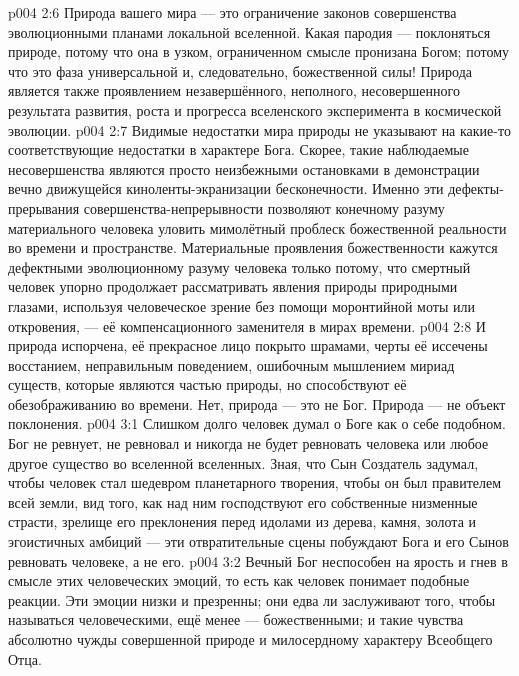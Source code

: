 \vs p004 2:6 Природа вашего мира --- это ограничение законов совершенства эволюционными планами локальной вселенной. Какая пародия --- поклоняться природе, потому что она в узком, ограниченном смысле пронизана Богом; потому что это фаза универсальной и, следовательно, божественной силы! Природа является также проявлением незавершённого, неполного, несовершенного результата развития, роста и прогресса вселенского эксперимента в космической эволюции.
\vs p004 2:7 Видимые недостатки мира природы не указывают на какие\hyp{}то соответствующие недостатки в характере Бога. Скорее, такие наблюдаемые несовершенства являются просто неизбежными остановками в демонстрации вечно движущейся киноленты\hyp{}экранизации бесконечности. Именно эти дефекты\hyp{}прерывания совершенства\hyp{}непрерывности позволяют конечному разуму материального человека уловить мимолётный проблеск божественной реальности во времени и пространстве. Материальные проявления божественности кажутся дефектными эволюционному разуму человека только потому, что смертный человек упорно продолжает рассматривать явления природы природными глазами, используя человеческое зрение без помощи моронтийной моты или откровения, --- её компенсационного заменителя в мирах времени.
\vs p004 2:8 И природа испорчена, её прекрасное лицо покрыто шрамами, черты её иссечены восстанием, неправильным поведением, ошибочным мышлением мириад существ, которые являются частью природы, но способствуют её обезображиванию во времени. Нет, природа --- это не Бог. Природа --- не объект поклонения.
\vs p004 3:1 Слишком долго человек думал о Боге как о себе подобном. Бог не ревнует, не ревновал и никогда не будет ревновать человека или любое другое существо во вселенной вселенных. Зная, что Сын Создатель задумал, чтобы человек стал шедевром планетарного творения, чтобы он был правителем всей земли, вид того, как над ним господствуют его собственные низменные страсти, зрелище его преклонения перед идолами из дерева, камня, золота и эгоистичных амбиций --- эти отвратительные сцены побуждают Бога и его Сынов ревновать  человеке, а не его.
\vs p004 3:2 Вечный Бог неспособен на ярость и гнев в смысле этих человеческих эмоций, то есть как человек понимает подобные реакции. Эти эмоции низки и презренны; они едва ли заслуживают того, чтобы называться человеческими, ещё менее --- божественными; и такие чувства абсолютно чужды совершенной природе и милосердному характеру Всеобщего Отца.
